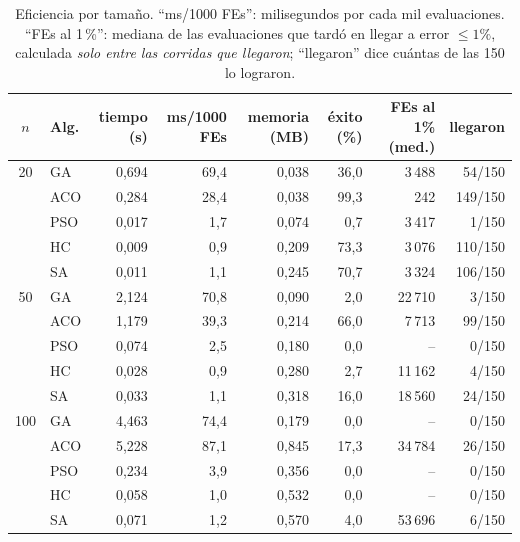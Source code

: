 \documentclass[11pt,a4paper]{article}
\begin{document}
\begin{table}[H]\centering\small
\begin{tabular}{clrrrrrr}
\toprule
$n$ & Alg. & tiempo (s) & ms/1000 FEs & memoria (MB) & éxito (\%) & FEs al 1\% (med.) & llegaron \\
\midrule
20 & GA & 0{,}694 & 69{,}4 & 0{,}038 & 36{,}0 & 3\,488 & 54/150 \\
 & ACO & 0{,}284 & 28{,}4 & 0{,}038 & 99{,}3 & 242 & 149/150 \\
 & PSO & 0{,}017 & 1{,}7 & 0{,}074 & 0{,}7 & 3\,417 & 1/150 \\
 & HC & 0{,}009 & 0{,}9 & 0{,}209 & 73{,}3 & 3\,076 & 110/150 \\
 & SA & 0{,}011 & 1{,}1 & 0{,}245 & 70{,}7 & 3\,324 & 106/150 \\
\midrule
50 & GA & 2{,}124 & 70{,}8 & 0{,}090 & 2{,}0 & 22\,710 & 3/150 \\
 & ACO & 1{,}179 & 39{,}3 & 0{,}214 & 66{,}0 & 7\,713 & 99/150 \\
 & PSO & 0{,}074 & 2{,}5 & 0{,}180 & 0{,}0 & -- & 0/150 \\
 & HC & 0{,}028 & 0{,}9 & 0{,}280 & 2{,}7 & 11\,162 & 4/150 \\
 & SA & 0{,}033 & 1{,}1 & 0{,}318 & 16{,}0 & 18\,560 & 24/150 \\
\midrule
100 & GA & 4{,}463 & 74{,}4 & 0{,}179 & 0{,}0 & -- & 0/150 \\
 & ACO & 5{,}228 & 87{,}1 & 0{,}845 & 17{,}3 & 34\,784 & 26/150 \\
 & PSO & 0{,}234 & 3{,}9 & 0{,}356 & 0{,}0 & -- & 0/150 \\
 & HC & 0{,}058 & 1{,}0 & 0{,}532 & 0{,}0 & -- & 0/150 \\
 & SA & 0{,}071 & 1{,}2 & 0{,}570 & 4{,}0 & 53\,696 & 6/150 \\
\bottomrule
\end{tabular}

\caption{Eficiencia por tamaño. ``ms/1000 FEs'': milisegundos por cada mil evaluaciones. ``FEs al 1\,\%'': mediana de las evaluaciones que tardó
en llegar a error $\le1\text{\%}$, calculada \emph{solo entre las corridas que llegaron}; ``llegaron'' dice cuántas de las 150 lo lograron.}
\end{table}
\end{document}
